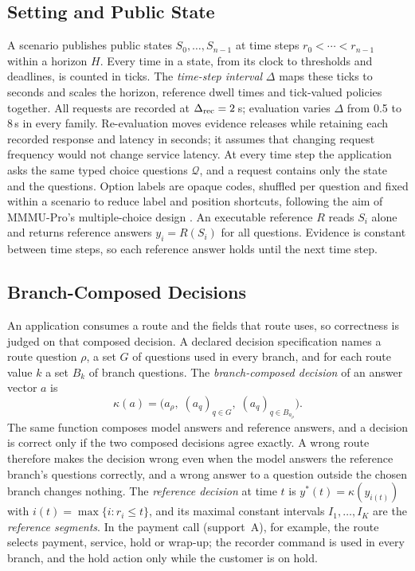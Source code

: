 \documentclass[11pt]{article}
\newcommand{\yref}{y^{*}}
\begin{document}
\subsection{Setting and Public State}
\label{sec:setting}
A scenario publishes public states $S_0,\ldots,S_{n-1}$ at time steps $r_0<\cdots<r_{n-1}$ within a horizon $H$.
Every time in a state, from its clock to thresholds and deadlines, is counted in ticks. The \emph{time-step interval} $\Delta$ maps these ticks to seconds and scales the horizon, reference dwell times and tick-valued policies together.
All requests are recorded at $\Delta_{\mathrm{rec}}=2$\,s; evaluation varies $\Delta$ from 0.5 to 8\,s in every family.
Re-evaluation moves evidence releases while retaining each recorded response and latency in seconds; it assumes that changing request frequency would not change service latency.
At every time step the application asks the same typed choice questions $\mathcal{Q}$, and a request contains only the state and the questions.
Option labels are opaque codes, shuffled per question and fixed within a scenario to reduce label and position shortcuts, following the aim of MMMU-Pro's multiple-choice design \citep{yue2025mmmupro}.
An executable reference $R$ reads $S_i$ alone and returns reference answers $y_i=R(S_i)$ for all questions.
Evidence is constant between time steps, so each reference answer holds until the next time step.

\subsection{Branch-Composed Decisions}
\label{sec:compose}
An application consumes a route and the fields that route uses, so correctness is judged on that composed decision.
A declared decision specification names a route question $\rho$, a set $G$ of questions used in every branch, and for each route value $k$ a set $B_k$ of branch questions.
The \emph{branch-composed decision} of an answer vector $a$ is
\begin{equation}
  \kappa(a)=\bigl(a_\rho,\;(a_q)_{q\in G},\;(a_q)_{q\in B_{a_\rho}}\bigr).
\end{equation}
The same function composes model answers and reference answers, and a decision is correct only if the two composed decisions agree exactly.
A wrong route therefore makes the decision wrong even when the model answers the reference branch's questions correctly, and a wrong answer to a question outside the chosen branch changes nothing.
The \emph{reference decision} at time $t$ is $\yref(t)=\kappa(y_{i(t)})$ with $i(t)=\max\{i:r_i\le t\}$, and its maximal constant intervals $I_1,\ldots,I_K$ are the \emph{reference segments}.
In the payment call (support~A), for example, the route selects payment, service, hold or wrap-up; the recorder command is used in every branch, and the hold action only while the customer is on hold.
\end{document}

